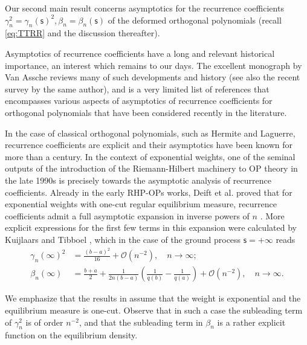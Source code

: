 \documentclass[reqno,a4paper,11pt]{amsart}
\newcommand{\Boh}{\mathcal{O}}
\newcommand{\msf}{\mathsf}
\newcommand{\sad}{\msf s}
\theoremstyle{definition}
\theoremstyle{remark}
\numberwithin{equation}{section}
\begin{document}
Our second main result concerns asymptotics for the recurrence coefficients $\gamma_n^2=\gamma_n(\sad)^2,\beta_n=\beta_n(\sad)$ of the deformed orthogonal polynomials (recall \eqref{eq:TTRR} and the discussion thereafter).

Asymptotics of recurrence coefficients have a long and relevant historical importance, an interest which remains to our days. The excellent monograph \cite{VanAsscheBook18} by Van Assche reviews many of such developments and history (see also the recent survey \cite{VanAsscheSurvey22} by the same author), and \cite{DeiftPiorkowski24, ClarksonJordaanLoureiro, Barhoumi24, bleher_deano_painleve_I, bleher_deano_yattselev_2017} is a very limited list of references that encompasses various aspects of asymptotics of recurrence coefficients for orthogonal polynomials that have been considered recently in the literature.

In the case of classical orthogonal polynomials, such as Hermite and Laguerre, recurrence coefficients are explicit and their asymptotics have been known for more than a century. In the context of exponential weights, one of the seminal outputs of the introduction of the Riemann-Hilbert machinery to OP theory in the late 1990s is precisely towards the asymptotic analysis of recurrence coefficients. Already in the early RHP-OPs works, Deift et al. proved that for exponential weights with one-cut regular equilibrium measure, recurrence coefficients admit a full asymptotic expansion in inverse powers of $n$ \cite{DKMVZ1}. More explicit expressions for the first few terms in this expansion were calculated by Kuijlaars and Tibboel \cite[Theorem~1.1]{Tibboel}, which in the case of the ground process $\sad = +\infty$ reads
%
\begin{equation}\label{deff:gammabetainfty}
    \begin{split}
    \gamma_n(\infty)^2 &=  \frac{(b-a)^{2}}{16} + \Boh(n^{-2}), \quad n \to \infty;\\
    \beta_n(\infty) &= \frac{b+a}{2} + \frac{1}{2n(b-a)} \left( \frac{1}{q(b)} - \frac{1}{q(a)}\right) + \Boh(n^{-2}), \quad n \to \infty.
    \end{split}
\end{equation}

We emphasize that the results in \cite{Tibboel, DKMVZ1} assume that the weight is exponential and the equilibrium measure is one-cut. Observe that in such a case the subleading term of $\gamma_n^2$ is of order $n^{-2}$, and that the subleading term in $\beta_n$ is a rather explicit function on the equilibrium density. 
\end{document}
